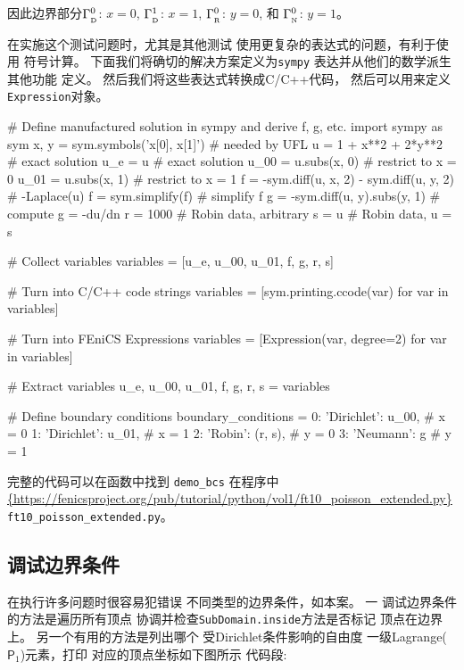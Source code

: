 因此边界部分$\GD^0$: $x=0$, $\GD^1$: $x=1$,
$\GR^0$: $y=0$, 和 $\GN^0$: $y=1$。

在实施这个测试问题时，尤其是其他测试
使用更复杂的表达式的问题，有利于使用
符号计算。 下面我们将确切的解决方案定义为\texttt{sympy}
表达并从他们的数学派生其他功能
定义。 然后我们将这些表达式转换成C/C++代码，
然后可以用来定义\texttt{Expression}对象。

\begin{python}
# Define manufactured solution in sympy and derive f, g, etc.
import sympy as sym
x, y = sym.symbols('x[0], x[1]')            # needed by UFL
u = 1 + x**2 + 2*y**2                       # exact solution
u_e = u                                     # exact solution
u_00 = u.subs(x, 0)                         # restrict to x = 0
u_01 = u.subs(x, 1)                         # restrict to x = 1
f = -sym.diff(u, x, 2) - sym.diff(u, y, 2)  # -Laplace(u)
f = sym.simplify(f)                         # simplify f
g = -sym.diff(u, y).subs(y, 1)              # compute g = -du/dn
r = 1000                                    # Robin data, arbitrary
s = u                                       # Robin data, u = s

# Collect variables
variables = [u_e, u_00, u_01, f, g, r, s]

# Turn into C/C++ code strings
variables = [sym.printing.ccode(var) for var in variables]

# Turn into FEniCS Expressions
variables = [Expression(var, degree=2) for var in variables]

# Extract variables
u_e, u_00, u_01, f, g, r, s = variables

# Define boundary conditions
boundary_conditions = {0: {'Dirichlet': u_00},   # x = 0
                       1: {'Dirichlet': u_01},   # x = 1
                       2: {'Robin':     (r, s)}, # y = 0
                       3: {'Neumann':   g}}      # y = 1
\end{python}

完整的代码可以在函数中找到
\verb!demo_bcs! 在程序中
\url{{https://fenicsproject.org/pub/tutorial/python/vol1/ft10_poisson_extended.py}}{\nolinkurl{ft10_poisson_extended.py}}。

\subsection{调试边界条件}

在执行许多问题时很容易犯错误
不同类型的边界条件，如本案。 一
调试边界条件的方法是遍历所有顶点
协调并检查\texttt{SubDomain.inside}方法是否标记
顶点在边界上。 另一个有用的方法是列出哪个
受Dirichlet条件影响的自由度
一级Lagrange($\mathsf{P} _1 $)元素，打印
对应的顶点坐标如下图所示
代码段:

